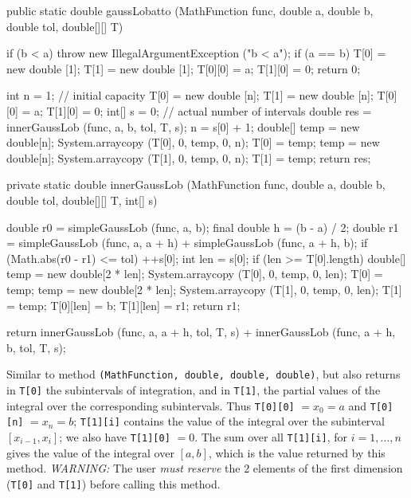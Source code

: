 \begin{code}

   public static double gaussLobatto (MathFunction func, double a, double b,
                                      double tol, double[][] T) \begin{hide} {
      if (b < a)
         throw new IllegalArgumentException ("b < a");
      if (a == b) {
         T[0] = new double [1];
         T[1] = new double [1];
         T[0][0] = a;
         T[1][0] = 0;
         return 0;
      }

      int n = 1;         // initial capacity
      T[0] = new double [n];
      T[1] = new double [n];
      T[0][0] = a;
      T[1][0] = 0;
      int[] s = {0};    // actual number of intervals
      double res = innerGaussLob (func, a, b, tol, T, s);
      n = s[0] + 1;
      double[] temp = new double[n];
      System.arraycopy (T[0], 0, temp, 0, n);
      T[0] = temp;
      temp = new double[n];
      System.arraycopy (T[1], 0, temp, 0, n);
      T[1] = temp;
      return res;
   }


   private static double innerGaussLob (MathFunction func, double a, double b,
                                        double tol, double[][] T, int[] s) {
      double r0 = simpleGaussLob (func, a, b);
      final double h = (b - a) / 2;
      double r1 = simpleGaussLob (func, a, a + h) +
                  simpleGaussLob (func, a + h, b);
      if (Math.abs(r0 - r1) <= tol) {
         ++s[0];
         int len = s[0];
         if (len >= T[0].length) {
            double[] temp = new double[2 * len];
            System.arraycopy (T[0], 0, temp, 0, len);
            T[0] = temp;
            temp = new double[2 * len];
            System.arraycopy (T[1], 0, temp, 0, len);
            T[1] = temp;
         }
         T[0][len] = b;
         T[1][len] = r1;
         return r1;
      }

      return innerGaussLob (func, a, a + h, tol, T, s) +
             innerGaussLob (func, a + h, b, tol, T, s);
   }\end{hide}
\end{code}
\begin{tabb}
Similar to method
\texttt{(MathFunction, double, double, double)}, but
also returns in \texttt{T[0]} the subintervals of integration, and in
\texttt{T[1]}, the partial values of the integral over the corresponding
 subintervals. Thus \texttt{T[0][0]} $= x_0 = a$ and \texttt{T[0][n]}
  $=x_n =b$; \texttt{T[1][i]} contains the value of the integral over
  the subinterval $[x_{i-1}, x_i]$; we also have \texttt{T[1][0]} $=0$.
 The sum over all \texttt{T[1][i]}, for $i=1, \ldots, n$ gives the
 value of the integral over $[a,b]$, which is the value returned by this
 method. \emph{WARNING:} The user \emph{must reserve}  the 2 elements
 of the first dimension (\texttt{T[0]} and \texttt{T[1]})
 before calling this method.
\end{tabb}
